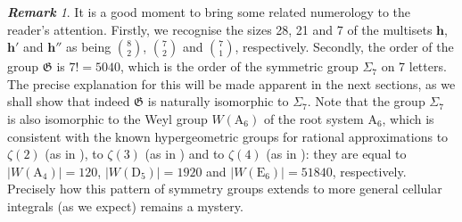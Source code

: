 \documentclass[12pt,reqno]{amsart}
\theoremstyle{remark}
\newtheorem{remark}{\bf Remark}
\newcommand\bh{\boldsymbol h}
\newcommand\frG{\mathfrak G}
\begin{document}
\begin{remark} 

\label{rem-num}
It is a good moment to bring some  related numerology to the reader's attention. 
Firstly, we  recognise the sizes 28, 21 and 7 of the multisets $\bh$, $\bh'$ and $\bh''$ as being $\binom82$, $\binom72$ and $\binom71$, respectively.
Secondly, the order of the group $\frG$ is $7!=5040$, which is  the order of the symmetric group $\Sigma_7$ on 7 letters. The precise explanation for this will be made apparent in the next sections, as we shall show that indeed $\frG$ is naturally isomorphic to $\Sigma_7$. 
Note that the group $\Sigma_7$ is also isomorphic   to  the Weyl group $W(\mathrm A_6)$ of the root system $\mathrm A_6$, which is consistent with the known hypergeometric groups for rational approximations to $\zeta(2)$ (as in \cite{RV96}), to $\zeta(3)$ (as in \cite{RV01}) and to $\zeta(4)$ (as in \cite{MZ20}): 
they are equal to $|W(\mathrm A_4)|=120$, $|W(\mathrm D_5)|=1920$ and $|W(\mathrm E_6)|=51840$, respectively.
Precisely how this pattern of symmetry groups extends to more general cellular integrals (as we expect) remains a mystery. 
\end{remark}
\end{document}
